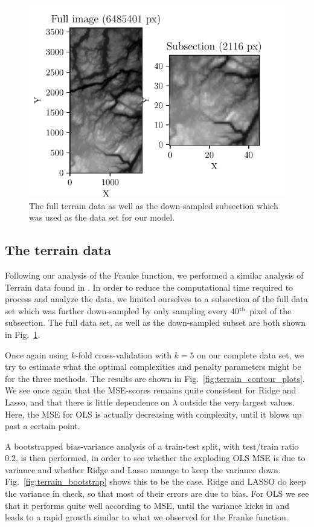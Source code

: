 \documentclass[reprint, english, nofootinbib]{revtex4-2}
\begin{document}
\begin{figure}[h!tb]
    \center
    \includegraphics[width=\columnwidth]{TerrainData.pdf}
    \caption{\label{fig:terrain image}The full terrain data as well as the down-sampled subsection which was used as the data set for our model.}
\end{figure}

\subsection{The terrain data}
\noindent
Following our analysis of the Franke function, we performed a similar analysis of Terrain data found in \cite{4155_repo}. In order to reduce the computational time required to process and analyze the data, we limited ourselves to a subsection of the full data set which was further down-sampled by only sampling every 40$^{\textup{th}}$ pixel of the subsection. The full data set, as well as the down-sampled subset are both shown in Fig.~\ref{fig:terrain image}.

Once again using $k$-fold cross-validation with $k=5$ on our complete data set, we try to estimate what the optimal complexities and penalty parameters might be for the three methods. The results are shown in Fig.~\ref{fig:terrain_contour_plots}. We see once again that the MSE-scores remains quite consistent for Ridge and Lasso, and that there is little dependence on $\lambda$ outside the very largest values. Here, the MSE for OLS is actually decreasing with complexity, until it blows up past a certain point.

A bootstrapped bias-variance analysis of a train-test split, with test/train ratio 0.2, is then performed, in order to see whether the exploding OLS MSE is due to variance and whether Ridge and Lasso manage to keep the variance down. Fig.~\ref{fig:terrain_bootstrap} shows this to be the case. Ridge and LASSO do keep the variance in check, so that most of their errors are due to bias. For OLS we see that it performs quite well according to MSE, until the variance kicks in and leads to a rapid growth similar to what we observed for the Franke function.
\end{document}
